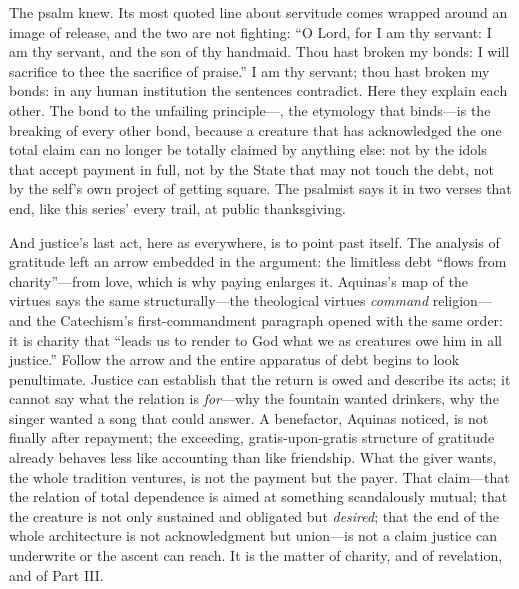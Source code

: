 The psalm knew. Its most quoted line about servitude comes wrapped around an image of release, and the two are not fighting: ``O Lord, for I am thy servant: I am thy servant, and the son of thy handmaid. Thou hast broken my bonds: I will sacrifice to thee the sacrifice of praise.'' I am thy servant; thou hast broken my bonds: in any human institution the sentences contradict. Here they explain each other. The bond to the unfailing principle---, the etymology that binds---is the breaking of every other bond, because a creature that has acknowledged the one total claim can no longer be totally claimed by anything else: not by the idols that accept payment in full, not by the State that may not touch the debt, not by the self's own project of getting square. The psalmist says it in two verses that end, like this series' every trail, at public thanksgiving.

And justice's last act, here as everywhere, is to point past itself. The analysis of gratitude left an arrow embedded in the argument: the limitless debt ``flows from charity''---from love, which is why paying enlarges it. Aquinas's map of the virtues says the same structurally---the theological virtues \emph{command} religion---and the Catechism's first-commandment paragraph opened with the same order: it is charity that ``leads us to render to God what we as creatures owe him in all justice.'' Follow the arrow and the entire apparatus of debt begins to look penultimate. Justice can establish that the return is owed and describe its acts; it cannot say what the relation is \emph{for}---why the fountain wanted drinkers, why the singer wanted a song that could answer. A benefactor, Aquinas noticed, is not finally after repayment; the exceeding, gratis-upon-gratis structure of gratitude already behaves less like accounting than like friendship. What the giver wants, the whole tradition ventures, is not the payment but the payer. That claim---that the relation of total dependence is aimed at something scandalously mutual; that the creature is not only sustained and obligated but \emph{desired}; that the end of the whole architecture is not acknowledgment but union---is not a claim justice can underwrite or the ascent can reach. It is the matter of charity, and of revelation, and of Part III.

